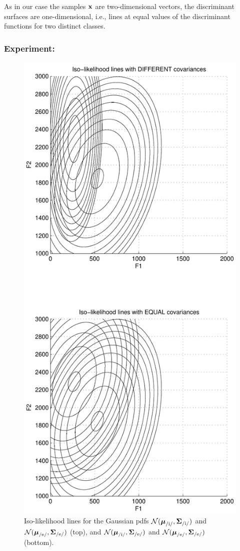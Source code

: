 \documentclass[a4paper]{article}
\newcommand{\xv}{\ensuremath\mathbf{x}}  %
\newcommand{\muv}{\ensuremath\boldsymbol{\mu}}  %
\newcommand{\Sm}{\ensuremath\boldsymbol{\Sigma}}  %
\begin{document}
As in our case the samples $\xv$ are two-dimensional vectors, the
discriminant surfaces are one-dimensional, i.e., lines at equal values
of the discriminant functions for two distinct classes.

\subsubsection{Experiment:}
\begin{figure}
\centerline{\includegraphics[height=0.95\textheight]{iso}}
\caption{\label{iso}Iso-likelihood lines for the Gaussian pdfs
  ${\cal N}(\muv_{\text{/i/}},\Sm_{\text{/i/}})$ and ${\cal
    N}(\muv_{\text{/e/}},\Sm_{\text{/e/}})$ (top), and ${\cal
    N}(\muv_{\text{/i/}},\Sm_{\text{/e/}})$ and ${\cal
    N}(\muv_{\text{/e/}},\Sm_{\text{/e/}})$ (bottom).}
\end{figure}
\end{document}

